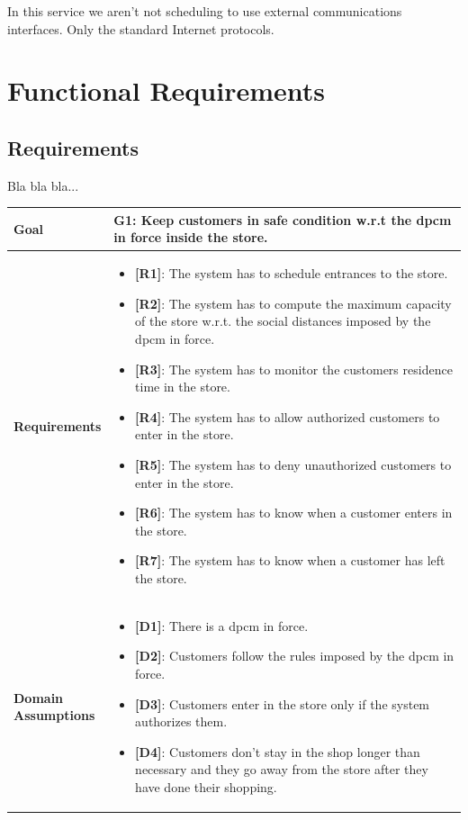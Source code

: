 In this service we aren't not scheduling to use external communications interfaces.
Only the standard Internet protocols.

\section{Functional Requirements}

\subsection{Requirements}

Bla bla bla...

\begin{table}[H]
\centering
\begin{tabular}{| m{} | m{} |} 
	\hline
	\textbf{Goal} &
		\textbf{G1: Keep customers in safe condition w.r.t the \gls{dpcm} in force inside the store.} \\
	\hline
	\textbf{Requirements} &
		\begin{itemize}
			\item {\textbf{[R1]}}: The system has to schedule entrances to the store.
			\item {\textbf{[R2]}}: The system has to compute the maximum capacity of the store w.r.t. the social distances imposed by the \gls{dpcm} in force.
			\item {\textbf{[R3]}}: The system has to monitor the customers residence time in the store.
			\item {\textbf{[R4]}}: The system has to allow authorized customers to enter in the store.
			\item {\textbf{[R5]}}: The system has to deny unauthorized customers to enter in the store.
			\item {\textbf{[R6]}}: The system has to know when a customer enters in the store.
			\item {\textbf{[R7]}}: The system has to know when a customer has left the store.
		\end{itemize} \\
	\hline
	\shortstack[l]{\textbf{Domain} \\ \textbf{Assumptions}} & 
		\begin{itemize}
			\item {\textbf{[D1]}}: There is a \gls{dpcm} in force.
			\item {\textbf{[D2]}}: Customers follow the rules imposed by the \gls{dpcm} in force.
			\item {\textbf{[D3]}}: Customers enter in the store only if the system authorizes them.
			\item {\textbf{[D4]}}: Customers don't stay in the shop longer than necessary and they go away from the store after they have done their shopping.
		\end{itemize} \\ 
	\hline
\end{tabular}
\end{table}

